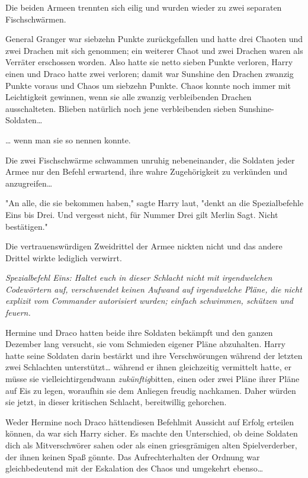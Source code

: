 {Die beiden Armeen trennten sich eilig und wurden wieder zu zwei separaten Fischschwärmen.

General Granger war siebzehn Punkte zurückgefallen und hatte drei Chaoten und zwei Drachen mit sich genommen; ein weiterer Chaot und zwei Drachen waren als Verräter erschossen worden. Also hatte sie netto sieben Punkte verloren, Harry einen und Draco hatte zwei verloren; damit war Sunshine den Drachen zwanzig Punkte voraus und Chaos um siebzehn Punkte. Chaos konnte noch immer mit Leichtigkeit gewinnen, wenn sie alle zwanzig verbleibenden Drachen ausschalteten. Blieben natürlich noch jene verbleibenden sieben Sunshine-Soldaten…

… wenn man sie so nennen konnte.

Die zwei Fischschwärme schwammen unruhig nebeneinander, die Soldaten jeder Armee nur den Befehl erwartend, ihre wahre Zugehörigkeit zu verkünden und anzugreifen…

"An alle, die sie bekommen haben," sagte Harry laut, "denkt an die Spezialbefehle Eins bis Drei. Und vergesst nicht, für Nummer Drei gilt Merlin Sagt. Nicht bestätigen."

Die vertrauenswürdigen Zweidrittel der Armee nickten nicht und das andere Drittel wirkte lediglich verwirrt.

\emph{Spezialbefehl Eins: Haltet euch in dieser Schlacht nicht mit irgendwelchen Codewörtern auf, verschwendet keinen Aufwand auf irgendwelche Pläne, die nicht explizit vom Commander autorisiert wurden; einfach schwimmen, schützen und feuern.}

Hermine und Draco hatten beide ihre Soldaten bekämpft und den ganzen Dezember lang versucht, sie vom Schmieden eigener Pläne abzuhalten. Harry hatte seine Soldaten darin bestärkt und ihre Verschwörungen während der letzten zwei Schlachten unterstützt… während er ihnen gleichzeitig vermittelt hatte, er müsse sie vielleichtirgendwann \emph{zukünftig}bitten, einen oder zwei Pläne ihrer Pläne auf Eis zu legen, woraufhin sie dem Anliegen freudig nachkamen. Daher würden sie jetzt, in dieser kritischen Schlacht, bereitwillig gehorchen.

Weder Hermine noch Draco hättendiesen Befehlmit Aussicht auf Erfolg erteilen können, da war sich Harry sicher. Es machte den Unterschied, ob deine Soldaten dich als Mitverschwörer sahen oder als einen griesgrämigen alten Spielverderber, der ihnen keinen Spaß gönnte. Das Aufrechterhalten der Ordnung war gleichbedeutend mit der Eskalation des Chaos und umgekehrt ebenso…

}
